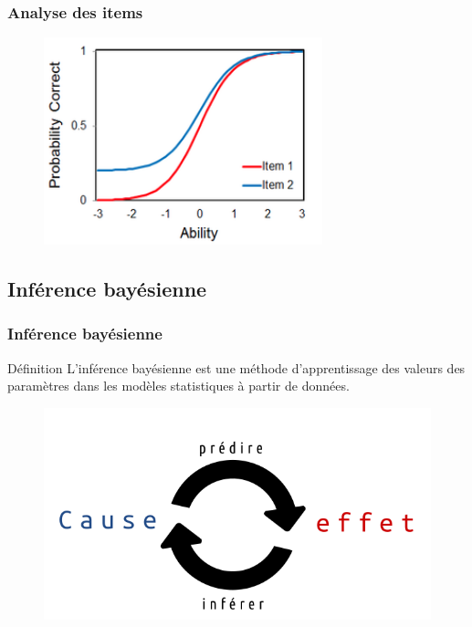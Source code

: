 \documentclass[aspectratio=169,professionalfonts, 12pt]{beamer}
\begin{document}
\begin{frame}
  \frametitle{Analyse des items}
  \justifying 
  \begin{minipage}{\textwidth}
  \begin{figure}[H]
      \includegraphics[height=6cm]{images/etat_art/IRT3.png}
  \end{figure}
  \end{minipage}
\end{frame}


\subsection{Inférence bayésienne}

\begin{frame}
  \frametitle{Inférence bayésienne}
  \begin{minipage}{0.4\textwidth}
    \begin{block}{Définition}
      L’inférence bayésienne est une méthode d’apprentissage des valeurs des paramètres dans les modèles statistiques à partir de données. 
    \end{block}
  \end{minipage}
  \begin{minipage}{2cm}
  
  \end{minipage}
  \begin{minipage}{0.5\textwidth}
    \begin{figure}[t]
    \begin{center}
      \includegraphics[width=\textwidth]{images/etat_art/predire_inferer.png}
    \end{center}
    \end{figure} 
  \end{minipage}	
\end{frame}
\end{document}
